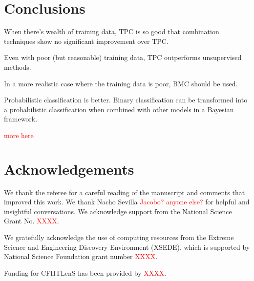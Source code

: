 \documentclass[useAMS,usenatbib]{mn2e}
\begin{document}
\section{Conclusions}
  \label{section:conclusions}

When there's wealth of training data,
TPC is so good that combination techniques show
no significant improvement over TPC.

Even with poor (but reasonable) training data,
TPC outperforms unsupervised methods.

In a more realistic case where the training data is poor,
BMC should be used.

Probabilistic classification is better.
Binary classification can be transformed into a probabilistic
classification when combined with other models in a Bayesian framework.

\textcolor{red}{more here}

\section*{Acknowledgements}

We thank the referee for a careful reading of the manuscript
and comments that improved this work.
We thank Nacho Sevilla \textcolor{red}{Jacobo? anyone else?} for helpful and insightful conversations.
We acknowledge support from the National Science Grant No.
\textcolor{red}{XXXX}.

We gratefully acknowledge the use of computing resources
from the Extreme Science and Engineering Discovery Environment (XSEDE),
which is supported by National Science Foundation grant number
\textcolor{red}{XXXX}.

Funding for CFHTLenS has been provided by
\textcolor{red}{XXXX}.





\bsp

\label{lastpage}
\end{document}
